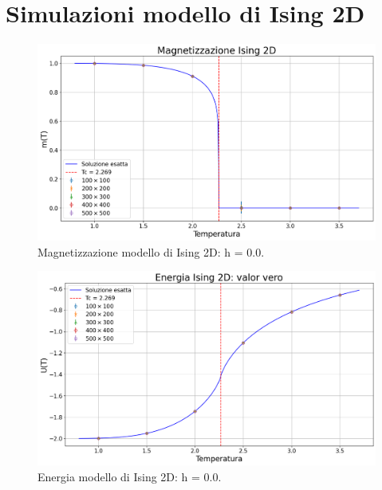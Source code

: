 \section{Simulazioni modello di Ising 2D}

\begin{figure}[H]
    \centering
    \includegraphics[width=\textwidth]{Immagini/simIsing2D/magn.png}
    \caption{Magnetizzazione modello di Ising 2D: h = 0.0.}
    \label{fig: magn_Ising2D}
\end{figure}

\begin{figure}[H]
    \centering
    \includegraphics[width=\textwidth]{Immagini/simIsing2D/ene.png}
    \caption{Energia modello di Ising 2D: h = 0.0.}
    \label{fig: ene_Ising2D}
\end{figure}
